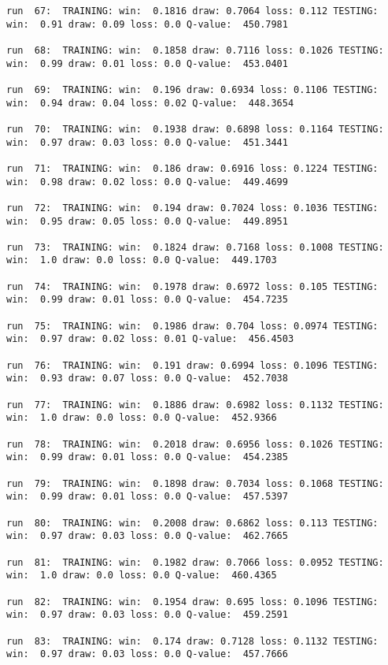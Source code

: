 \documentclass[11pt]{article}
\begin{document}
\begin{Verbatim}[commandchars=\\\{\}]
run  67:  TRAINING: win:  0.1816 draw: 0.7064 loss: 0.112 TESTING: win:  0.91 draw: 0.09 loss: 0.0 Q-value:  450.7981

run  68:  TRAINING: win:  0.1858 draw: 0.7116 loss: 0.1026 TESTING: win:  0.99 draw: 0.01 loss: 0.0 Q-value:  453.0401

run  69:  TRAINING: win:  0.196 draw: 0.6934 loss: 0.1106 TESTING: win:  0.94 draw: 0.04 loss: 0.02 Q-value:  448.3654

run  70:  TRAINING: win:  0.1938 draw: 0.6898 loss: 0.1164 TESTING: win:  0.97 draw: 0.03 loss: 0.0 Q-value:  451.3441

run  71:  TRAINING: win:  0.186 draw: 0.6916 loss: 0.1224 TESTING: win:  0.98 draw: 0.02 loss: 0.0 Q-value:  449.4699

run  72:  TRAINING: win:  0.194 draw: 0.7024 loss: 0.1036 TESTING: win:  0.95 draw: 0.05 loss: 0.0 Q-value:  449.8951

run  73:  TRAINING: win:  0.1824 draw: 0.7168 loss: 0.1008 TESTING: win:  1.0 draw: 0.0 loss: 0.0 Q-value:  449.1703

run  74:  TRAINING: win:  0.1978 draw: 0.6972 loss: 0.105 TESTING: win:  0.99 draw: 0.01 loss: 0.0 Q-value:  454.7235

run  75:  TRAINING: win:  0.1986 draw: 0.704 loss: 0.0974 TESTING: win:  0.97 draw: 0.02 loss: 0.01 Q-value:  456.4503

run  76:  TRAINING: win:  0.191 draw: 0.6994 loss: 0.1096 TESTING: win:  0.93 draw: 0.07 loss: 0.0 Q-value:  452.7038

run  77:  TRAINING: win:  0.1886 draw: 0.6982 loss: 0.1132 TESTING: win:  1.0 draw: 0.0 loss: 0.0 Q-value:  452.9366

run  78:  TRAINING: win:  0.2018 draw: 0.6956 loss: 0.1026 TESTING: win:  0.99 draw: 0.01 loss: 0.0 Q-value:  454.2385

run  79:  TRAINING: win:  0.1898 draw: 0.7034 loss: 0.1068 TESTING: win:  0.99 draw: 0.01 loss: 0.0 Q-value:  457.5397

run  80:  TRAINING: win:  0.2008 draw: 0.6862 loss: 0.113 TESTING: win:  0.97 draw: 0.03 loss: 0.0 Q-value:  462.7665

run  81:  TRAINING: win:  0.1982 draw: 0.7066 loss: 0.0952 TESTING: win:  1.0 draw: 0.0 loss: 0.0 Q-value:  460.4365

run  82:  TRAINING: win:  0.1954 draw: 0.695 loss: 0.1096 TESTING: win:  0.97 draw: 0.03 loss: 0.0 Q-value:  459.2591

run  83:  TRAINING: win:  0.174 draw: 0.7128 loss: 0.1132 TESTING: win:  0.97 draw: 0.03 loss: 0.0 Q-value:  457.7666


\end{Verbatim}
\end{document}

